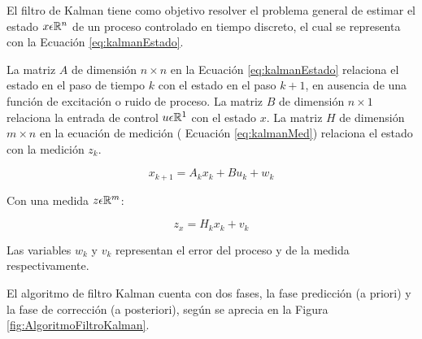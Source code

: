 El filtro de Kalman tiene como objetivo resolver el problema general de estimar el estado $x \space \epsilon \space \mathbb{R} ^{n}$ de un proceso controlado en tiempo discreto, el cual se representa con la Ecuación \ref{eq:kalmanEstado}.

La matriz $A$  de dimensión $n\times{}n$ en la Ecuación \ref{eq:kalmanEstado} relaciona el estado en el paso de tiempo $k$ con el estado en el paso $k + 1$, en ausencia de una función de excitación o ruido de proceso. La matriz $B$ de dimensión $n\times{}1$ relaciona la entrada de control $u \space \epsilon \mathbb{R}^{1}$ con el estado $x$. La matriz $H$ de dimensión $m\times{}n$ en la ecuación de medición ( Ecuación \ref{eq:kalmanMed}) relaciona el estado con la medición $z_k$.

\begin{equation}
\label{eq:kalmanEstado}
    x_{k+1} = A_kx_k + Bu_k + w_k
\end{equation}

Con una medida $z \space \epsilon \space \mathbb{R}^{m}$:

\begin{equation}
\label{eq:kalmanMed}
    z_x = H_kx_k + v_k
\end{equation}

Las variables $w_k$ y $v_k$ representan el error del proceso y de la medida respectivamente.

El algoritmo de filtro Kalman cuenta con dos fases, la fase predicción (a priori) y la fase de corrección (a posteriori), según se aprecia en la Figura \ref{fig:AlgoritmoFiltroKalman}.


